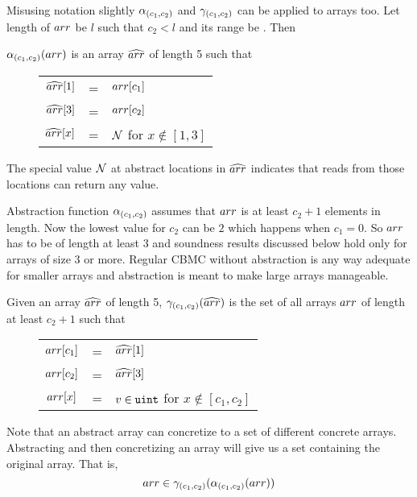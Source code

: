 Misusing notation slightly \(\alpha_{(c_1,c_2)}\) and \(\gamma_{(c_1,c_2)}\) can be applied to arrays too.
Let length of \(arr\) be \(l\) such that \(c_2 < l\) and its range be \sizet. Then

\(\alpha_{(c_1,c_2)}(arr)\) is an array \(\widehat{arr}\) of length 5 such that

\begin{figure}[H]
  \centering
  \begin{tabular}{ccl}
    \(\widehat{arr}[1]\)  &=& \(arr[c_1]\) \\
    \(\widehat{arr}[3]\)  &=& \(arr[c_2]\) \\
    \(\widehat{arr}[x]\)  &=& \(\mathcal{N}\) for \(x \notin [1,3]\)\\
    \end{tabular}
\end{figure}

The special value \(\mathcal{N}\) at abstract locations in \(\widehat{arr}\) indicates that
reads from those locations can return any value.

\begin{remark}
Abstraction function \(\alpha_{(c_1,c_2)}\) assumes that \(arr\) is at least
\(c_2+1\) elements in length. Now the lowest value for \(c_2\) can be
\(2\) which happens when \(c_1 = 0\). So \(arr\) has to be of length
at least 3 and soundness results discussed below hold only for arrays
of size 3 or more. Regular CBMC without abstraction is any way
adequate for smaller arrays and abstraction is meant to make large
arrays manageable.
\end{remark}

Given an
array \(\widehat{arr}\) of length 5, \(\gamma_{(c_1,c_2)}(\widehat{arr})\) is the set of
all arrays \(arr\) of length at least \(c_2+1\) such that

\begin{figure}[H]
  \centering
  \begin{tabular}{ccl}
    \(arr[c_1]\)  &=& \(\widehat{arr}[1]\) \\
    \(arr[c_2]\)  &=& \(\widehat{arr}[3]\) \\
    \(arr[x]\)  &=& \(v \in {\tt uint}\) for \(x \notin [c_1,c_2]\)\\
    \end{tabular}
\end{figure}

Note that an abstract array can concretize to a set of different
concrete arrays. Abstracting and then concretizing an array will give us a
set containing the original array. That is,
\[arr \in \gamma_{(c_1,c_2)}(\alpha_{(c_1,c_2)}(arr))\]

